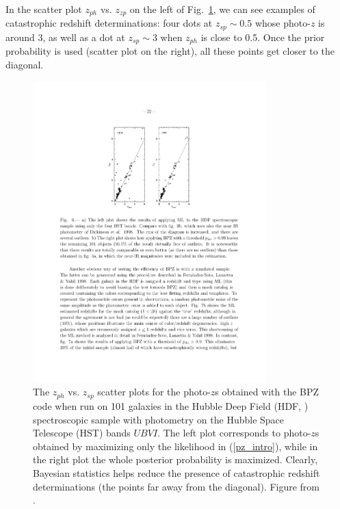 In the scatter plot $z_{ph}$ vs. $z_{zp}$ on the left of Fig.~\ref{fig:prior}, we can see examples of catastrophic redshift determinations: four dots at $z_{sp}\sim 0.5$ whose photo-$z$ is around 3, as well as a dot at $z_{sp}\sim3$ when $z_{ph}$ is close to 0.5. Once the prior probability is used (scatter plot on the right), all these points get closer to the diagonal.
\begin{figure}
\centering
\includegraphics[width=90mm]{./plots/prior_catastrophic.pdf}
\caption{The $z_{ph}$ vs. $z_{sp}$ scatter plots for the photo-$z$s obtained with the BPZ code when run on 101 galaxies in the Hubble Deep Field (HDF, \citet{Williams1996}) spectroscopic sample with photometry on the Hubble Space Telescope (HST) bands $UBVI$. The left plot corresponds to photo-$z$s obtained by maximizing only the likelihood in (\ref{pz_intro}), while in the right plot the whole posterior probability is maximized. Clearly, Bayesian statistics helps reduce the presence of catastrophic redshift determinations (the points far away from the diagonal). Figure from \citet{Benitez2000}.}
\label{fig:prior}
\end{figure}

